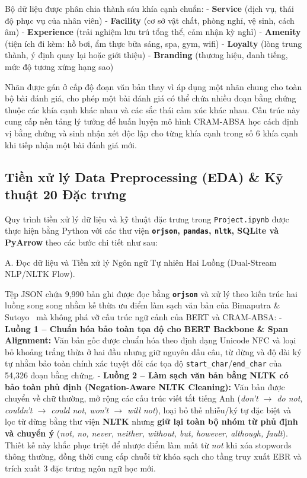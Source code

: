 \documentclass[pdflatex,sn-mathphys-num]{sn-jnl}
\theoremstyle{thmstyleone}
\theoremstyle{thmstyletwo}
\theoremstyle{thmstylethree}
\begin{document}
Bộ dữ liệu được phân chia thành sáu khía cạnh chuẩn: 
- \textbf{Service} (dịch vụ, thái độ phục vụ của nhân viên)
- \textbf{Facility} (cơ sở vật chất, phòng nghỉ, vệ sinh, cách âm)
- \textbf{Experience} (trải nghiệm lưu trú tổng thể, cảm nhận kỳ nghỉ)
- \textbf{Amenity} (tiện ích đi kèm: hồ bơi, ẩm thực bữa sáng, spa, gym, wifi)
- \textbf{Loyalty} (lòng trung thành, ý định quay lại hoặc giới thiệu)
- \textbf{Branding} (thương hiệu, danh tiếng, mức độ tương xứng hạng sao)

Nhãn được gán ở cấp độ đoạn văn bản thay vì áp dụng một nhãn chung cho toàn bộ bài đánh giá, cho phép một bài đánh giá có thể chứa nhiều đoạn bằng chứng thuộc các khía cạnh khác nhau và các sắc thái cảm xúc khác nhau. Cấu trúc này cung cấp nền tảng lý tưởng để huấn luyện mô hình CRAM-ABSA học cách định vị bằng chứng và sinh nhận xét độc lập cho từng khía cạnh trong số 6 khía cạnh khi tiếp nhận một bài đánh giá mới.


\subsection{Tiền xử lý \- Data Preprocessing (EDA) \& Kỹ thuật 20 Đặc trưng}
\label{subsec:datapreprocessing}

Quy trình tiền xử lý dữ liệu và kỹ thuật đặc trưng trong \texttt{Project.ipynb} được thực hiện bằng Python với các thư viện \textbf{\texttt{orjson}, \texttt{pandas}, \texttt{nltk}, SQLite và PyArrow} theo các bước chi tiết như sau:

A. Đọc dữ liệu và Tiền xử lý Ngôn ngữ Tự nhiên Hai Luồng (Dual-Stream NLP/NLTK Flow).

Tệp JSON chứa 9,990 bản ghi được đọc bằng \textbf{\texttt{orjson}} và xử lý theo kiến trúc hai luồng song song nhằm kế thừa ưu điểm làm sạch văn bản của Bimaputra \& Sutoyo~\cite{bimaputra2023aspect} mà không phá vỡ cấu trúc ngữ cảnh của BERT và CRAM-ABSA:
- \textbf{Luồng 1 -- Chuẩn hóa bảo toàn tọa độ cho BERT Backbone \& Span Alignment:} Văn bản gốc được chuẩn hóa theo định dạng Unicode NFC và loại bỏ khoảng trắng thừa ở hai đầu nhưng giữ nguyên dấu câu, từ dừng và độ dài ký tự nhằm bảo toàn chính xác tuyệt đối các tọa độ \texttt{start\_char}/\texttt{end\_char} của 54,326 đoạn bằng chứng.
- \textbf{Luồng 2 -- Làm sạch văn bản bằng NLTK có bảo toàn phủ định (Negation-Aware NLTK Cleaning):} Văn bản được chuyển về chữ thường, mở rộng các cấu trúc viết tắt tiếng Anh (\textit{don't $\to$ do not, couldn't $\to$ could not, won't $\to$ will not}), loại bỏ thẻ nhiễu/ký tự đặc biệt và lọc từ dừng bằng thư viện \textbf{NLTK} nhưng \textbf{giữ lại toàn bộ nhóm từ phủ định và chuyển ý} (\textit{not, no, never, neither, without, but, however, although, fault}). Thiết kế này khắc phục triệt để nhược điểm làm mất từ \textit{not} khi xóa stopwords thông thường, đồng thời cung cấp chuỗi từ khóa sạch cho tầng truy xuất EBR và trích xuất 3 đặc trưng ngôn ngữ học mới.
\end{document}

